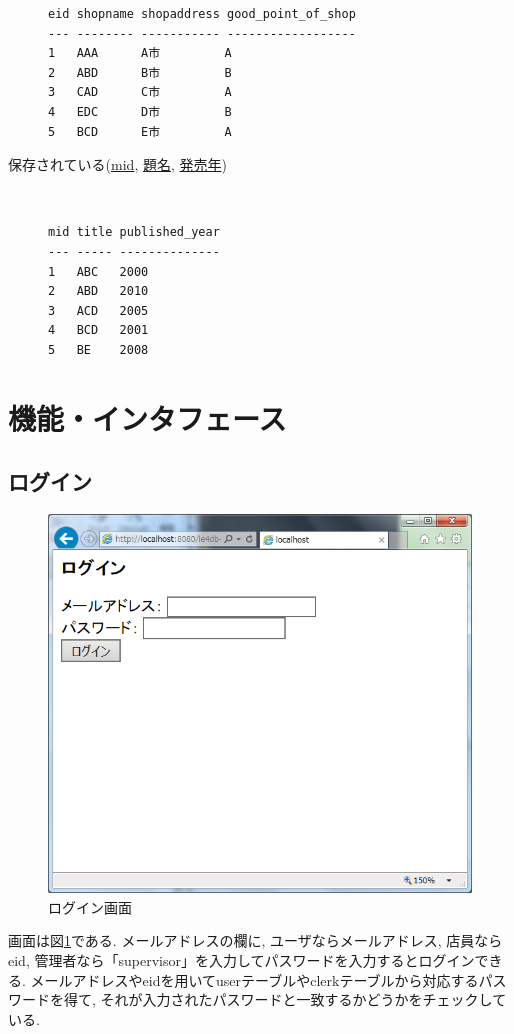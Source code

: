 \documentclass{jarticle}
\begin{document}
\begin{description}
\begin{verbatim}
eid shopname shopaddress good_point_of_shop
--- -------- ----------- ------------------
1   AAA      A市         A
2   ABD      B市         B
3   CAD      C市         A
4   EDC      D市         B
5   BCD      E市         A
\end{verbatim}
\item[保存されている(\underline{mid}, \underline{題名}, \underline{発売年})] \leavevmode \\
\begin{verbatim}
mid title published_year
--- ----- --------------
1   ABC   2000
2   ABD   2010
3   ACD   2005
4   BCD   2001
5   BE    2008
\end{verbatim}
\end{description}

\section{機能・インタフェース}
\subsection{ログイン}
\begin{figure}[tp]
\begin{center}
\includegraphics[scale=0.5]{login.png}
\end{center}
\caption{ログイン画面}
\label{fig:login}
\end{figure}
画面は図\ref{fig:login}である. メールアドレスの欄に, ユーザならメールアドレス, 店員ならeid, 管理者なら「supervisor」を入力してパスワードを入力するとログインできる. メールアドレスやeidを用いてuserテーブルやclerkテーブルから対応するパスワードを得て, それが入力されたパスワードと一致するかどうかをチェックしている.
\end{document}
